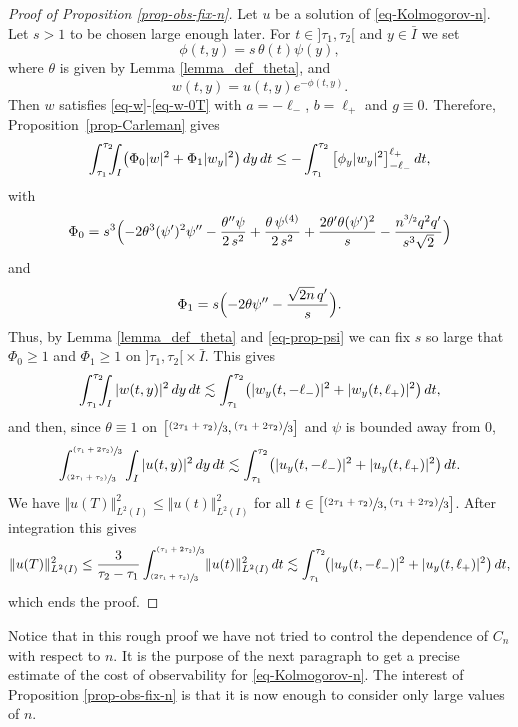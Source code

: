 \documentclass[10pt]{amsart}
\newcommand{\psfrac}[2]{\sfrac{(#1)}{#2}}
\theoremstyle{plain}
\theoremstyle{definition}
\newcommand{\abs}[1]{\vert #1\vert}
\newcommand{\nr}[1]{\Vert #1\Vert}
\newcommand{\1}{\mathds 1}
\begin{document}
\begin{proof}[Proof of Proposition \ref{prop-obs-fix-n}]
Let $u$ be a solution of \eqref{eq-Kolmogorov-n}. Let $s >1$ to be chosen large enough later. For $t \in{}]\tau_1,\tau_2[$ and $y \in \bar I$ we set
\[
\phi(t,y) = s \, \theta(t) \psi (y),
\]
where $\theta$ is given by Lemma \ref{lemma_def_theta}, and
\[
w(t,y) = u(t,y) e^{-\phi(t,y)}.
\]
Then $w$ satisfies \eqref{eq-w}-\eqref{eq-w-0T} with $a = -\ell_-$, $b = \ell_+$ and $g \equiv 0$. Therefore,
Proposition~\ref{prop-Carleman} gives
\[
\int_{\tau_1}^{\tau_2}\hspace*{-2mm} \int_I \bigl(\Phi_0 \abs w^2 + \Phi_1 \abs{w_y}^2 \bigr) \, dy \, dt
\leq - \int_{\tau_1}^{\tau_2} \big[ \phi_y \abs{w_y}^2 \big]_{-\ell_-}^{\ell_+} \, dt,
\]
with
\begin{equation} \label{eq_Phi0_fixedn}
\Phi_0 = s^3 \Bigl(- 2 \theta^3 (\psi')^2 \psi'' - \frac {\theta'' \psi}{2\,s^2} + \frac {\theta\, \psi^{(4)}}{2\,s^2} + \frac{2\theta' \theta (\psi')^2}{s} - \frac{n^{\sfrac{3}{2}}q^2 q'}{s^3\sqrt{2}} \Bigr)
\end{equation}
and
\begin{equation} \label{eq_Phi1_fixedn}
\Phi_1 = s \Bigl(- 2 \theta \psi''- \frac{\sqrt {2n}\, q'}{s}\Bigr).
\end{equation}
Thus, by Lemma \ref{lemma_def_theta} and \eqref{eq-prop-psi} we can fix $s$ so large that $\Phi_0 \geq 1$ and $\Phi_1 \geq 1$ on $]\tau_1,\tau_2[{}\times \bar I$. This gives
\[
\int_{\tau_1}^{\tau_2}\hspace*{-2mm} \int_{I} \vert w(t,y) \vert^2 \, dy\, dt \lesssim \int_{\tau_1}^{\tau_2} \bigl(\vert w_y(t,-\ell_-) \vert^2 + \vert w_y(t,\ell_+) \vert^2 \bigr) \, dt,
\]
and then, since $\theta \equiv 1$ on $\big[\psfrac{2\tau_1 + \tau_2}{3},\psfrac{\tau_1 + 2\tau_2}{3} \big]$ and $\psi$ is bounded away from 0,
\[
\int_{\psfrac{2\tau_1 + \tau_2}{3}}^{\psfrac{\tau_1 + 2\tau_2}{3}} \int_{I} \vert u(t,y) \vert^2 \, dy\, dt \lesssim \int_{\tau_1}^{\tau_2} \bigl(\vert u_y(t,-\ell_-) \vert^2 + \vert u_y(t,\ell_+) \vert^2 \bigr) \, dt.
\]
We have $\nr{u(T)}_{L^2(I)}^2 \leq \nr{u(t)}_{L^2(I)}^2$ for all $t \in \big[\psfrac{2\tau_1 + \tau_2}{3},\psfrac{\tau_1 + 2\tau_2}{3} \big]$. After integration this gives
\[
\nr{u(T)}_{L^2(I)}^2 \leq \frac{3}{\tau_2 - \tau_1} \int_{\psfrac{2\tau_1 + \tau_2}{3}}^{\psfrac{\tau_1 + 2\tau_2}{3}}\! \nr{u(t)}_{L^2(I)}^2 \, dt \lesssim \int_{\tau_1}^{\tau_2}\! \bigl(\vert u_y(t,-\ell_-) \vert^2 + \vert u_y(t,\ell_+) \vert^2 \bigr) \, dt,
\]
which ends the proof.
\end{proof}

Notice that in this rough proof we have not tried to control the dependence of $C_n$ with respect to $n$. It is the purpose of the next paragraph to get a precise estimate of the cost of observability for \eqref{eq-Kolmogorov-n}. The interest of Proposition \ref{prop-obs-fix-n} is that it is now enough to consider only large values of $n$.
\end{document}
